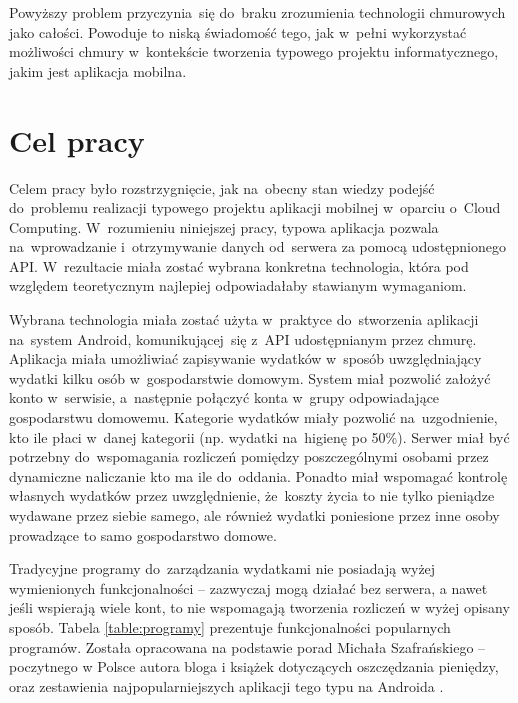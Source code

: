 \documentclass[12pt,a4paper,twoside,titlepage,openright]{book}
\begin{document}
Powyższy problem przyczynia~się do~braku zrozumienia technologii chmurowych jako całości. Powoduje to niską świadomość tego, jak w~pełni wykorzystać możliwości chmury w~kontekście tworzenia typowego projektu informatycznego, jakim jest aplikacja mobilna.





\section*{Cel pracy}


Celem pracy było rozstrzygnięcie, jak na~obecny stan wiedzy podejść do~problemu realizacji typowego projektu aplikacji mobilnej w~oparciu o~Cloud Computing. W~rozumieniu niniejszej pracy, typowa aplikacja pozwala na~wprowadzanie i~otrzymywanie danych od~serwera za pomocą udostępnionego API. W~rezultacie miała zostać wybrana konkretna technologia, która pod względem teoretycznym najlepiej odpowiadałaby stawianym wymaganiom.

Wybrana technologia miała zostać użyta w~praktyce do~stworzenia aplikacji na~system Android, komunikującej~się z~API udostępnianym przez chmurę. Aplikacja miała umożliwiać zapisywanie wydatków w~sposób uwzględniający wydatki kilku osób w~gospodarstwie domowym. System miał pozwolić założyć konto w~serwisie, a~następnie połączyć konta w~grupy odpowiadające gospodarstwu domowemu. Kategorie wydatków miały pozwolić na~uzgodnienie, kto ile płaci w~danej kategorii (np. wydatki na~higienę po 50\%). Serwer miał być potrzebny do~wspomagania rozliczeń pomiędzy poszczególnymi osobami przez dynamiczne naliczanie kto ma ile do~oddania. Ponadto miał wspomagać kontrolę własnych wydatków przez uwzględnienie, że~koszty życia to nie tylko pieniądze wydawane przez siebie samego, ale również wydatki poniesione przez inne osoby prowadzące to samo gospodarstwo domowe. 

Tradycyjne programy do~zarządzania wydatkami nie posiadają wyżej wymienionych funkcjonalności -- zazwyczaj mogą działać bez serwera, a nawet jeśli wspierają wiele kont, to nie wspomagają tworzenia rozliczeń w wyżej opisany sposób. Tabela \ref{table:programy} prezentuje funkcjonalności popularnych programów. Została opracowana na podstawie porad Michała Szafrańskiego -- poczytnego w Polsce autora bloga i książek dotyczących oszczędzania pieniędzy,\cite{siteJakOszczedzacPieniadze} oraz zestawienia najpopularniejszych aplikacji tego typu na Androida \cite{siteAppsForAndroid}. 
\end{document}
